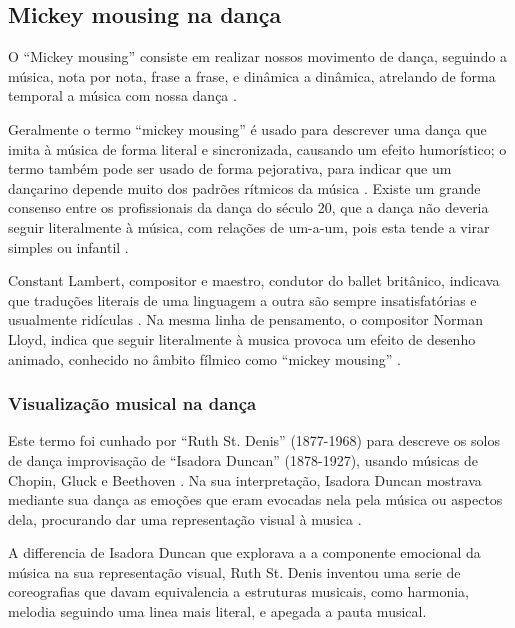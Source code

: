 \subsection{Mickey mousing na dança} 

O ``Mickey mousing'' consiste em realizar nossos movimento de dança,
seguindo a música, nota por nota, frase a frase, e dinâmica a dinâmica,
atrelando de forma temporal a música com nossa dança
\cite[pp. 460]{preston1995dance}.

Geralmente o termo ``mickey mousing'' é usado para descrever 
uma dança que imita à música de forma literal e sincronizada, causando um efeito humorístico;
o termo também pode ser usado de forma pejorativa, 
para indicar que um dançarino depende muito dos padrões rítmicos da música \cite{butterworth2011dance}.
Existe um grande consenso entre os profissionais da dança do século 20,
que a dança não deveria seguir literalmente à música, com relações de um-a-um, 
pois esta tende a virar simples ou infantil \cite[pp. 242-243]{dithmer2002another}.

Constant Lambert,  compositor e maestro, condutor do ballet britânico,
indicava que traduções literais de uma linguagem a outra são sempre insatisfatórias 
e usualmente ridículas \cite[pp. 242-243]{dithmer2002another}.
Na mesma linha de pensamento, o compositor Norman Lloyd,
indica que seguir literalmente à musica provoca um efeito de desenho animado,
conhecido no âmbito fílmico como ``mickey mousing''
\cite[pp. 242-243]{dithmer2002another}.

\subsubsection{Visualização musical na dança}
Este termo foi cunhado por ``Ruth St. Denis'' (1877-1968) 
para descreve os solos de dança improvisação  de ``Isadora Duncan'' (1878-1927),
usando músicas de Chopin, Gluck e Beethoven \cite{butterworth2011dance} \cite[pp. 473]{runco1999encyclopedia}.
Na sua interpretação, 
Isadora Duncan mostrava mediante sua dança as emoções que eram evocadas nela pela música 
ou aspectos dela, procurando dar uma representação visual à musica
\cite{butterworth2011dance} \cite[pp. 473]{runco1999encyclopedia}.

A differencia de Isadora Duncan que explorava a a componente emocional da música na sua representação visual,
Ruth St. Denis inventou uma serie de coreografias que davam equivalencia a estruturas musicais,
como harmonia, melodia \cite[pp. 149]{walden2013representation} seguindo uma linea mais literal,
e apegada a pauta musical.

